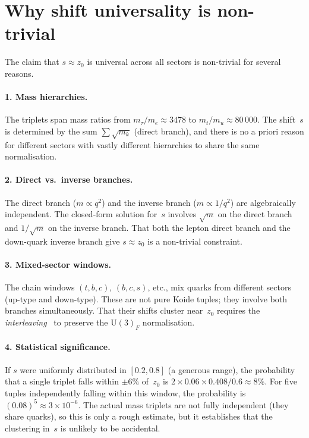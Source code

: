 \documentclass[preprint,12pt]{elsarticle}
\newcommand{\UU}{\mathrm{U}}
\begin{document}
\section{Why shift universality is non-trivial}
\label{sec:nontrivial}

The claim that $s \approx z_0$ is universal across all sectors
is non-trivial for several reasons.

\paragraph{1. Mass hierarchies.}
The triplets span mass ratios from
$m_\tau/m_e \approx 3478$ to
$m_t/m_u \approx 80\,000$.
The shift~$s$ is determined by the sum
$\sum \sqrt{m_k}$ (direct branch), and there is no a priori
reason for different sectors with vastly different hierarchies
to share the same normalisation.

\paragraph{2. Direct vs.\ inverse branches.}
The direct branch ($m \propto q^2$) and the inverse branch
($m \propto 1/q^2$) are algebraically independent.
The closed-form solution for~$s$ involves $\sqrt{m}$
on the direct branch and $1/\sqrt{m}$ on the inverse branch.
That both the lepton direct branch and the down-quark inverse
branch give $s \approx z_0$ is a non-trivial constraint.

\paragraph{3. Mixed-sector windows.}
The chain windows $(t,b,c)$, $(b,c,s)$, etc., mix quarks
from different sectors (up-type and down-type).
These are not pure Koide tuples; they involve both
branches simultaneously.  That their shifts cluster
near~$z_0$ requires the
\emph{interleaving}~\cite{waterfall} to preserve the
$\UU(3)_F$ normalisation.

\paragraph{4. Statistical significance.}
If $s$ were uniformly distributed in $[0.2, 0.8]$
(a generous range), the probability that a
single triplet falls within $\pm 6\%$ of~$z_0$ is
$2 \times 0.06 \times 0.408 / 0.6 \approx 8\%$.
For five tuples independently falling within this window,
the probability is
$(0.08)^5 \approx 3 \times 10^{-6}$.
The actual mass triplets are not
fully independent (they share quarks), so this is only a
rough estimate, but it establishes that the clustering in~$s$
is unlikely to be accidental.
\end{document}

